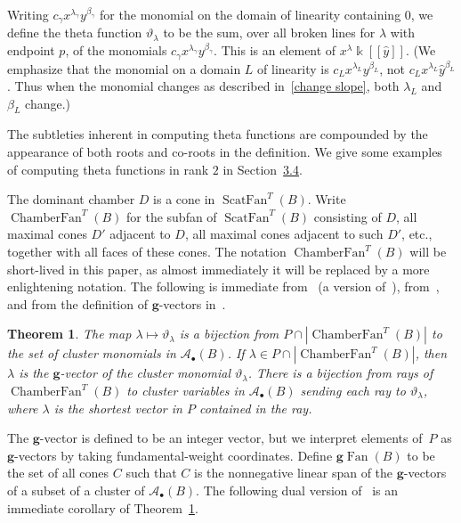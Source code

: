 \documentclass[10pt,a4paper]{amsart}
\newtheorem{theorem}{Theorem}[section]
\theoremstyle{definition}
\DeclareMathOperator{\Fan}{Fan}
\DeclareMathOperator{\ChamberFan}{ChamberFan}
\DeclareMathOperator{\ScatFan}{ScatFan}
\newcommand{\gFan}{\g\!\Fan}
\newcommand\llbracket{[\![}
\newcommand\rrbracket{]\!]}
\newcommand{\thet}{\vartheta}
\newcommand{\A}{{\mathcal A}}
\newcommand{\g}{\mathbf{g}}
\renewcommand{\k}{\Bbbk}
\newcommand{\hy}{\hat{y}}
\begin{document}
Writing $c_\gamma x^{\lambda_\gamma}y^{\beta_\gamma}$ for the monomial on the domain of linearity containing $0$, we define the theta function $\thet_\lambda$ to be the sum, over all broken lines for $\lambda$ with endpoint $p$, of the monomials $c_\gamma x^{\lambda_\gamma}y^{\beta_\gamma}$.
This is an element of $x^\lambda \k\llbracket \hy\rrbracket $.
(We emphasize that the monomial on a domain $L$ of linearity is $c_Lx^{\lambda_L}y^{\beta_L}$, not $c_Lx^{\lambda_L}\hy^{\beta_L}$.
Thus when the monomial changes as described in~\ref{change slope}, both $\lambda_L$ and $\beta_L$ change.)

The subtleties inherent in computing theta functions are compounded by the appearance of both roots and co-roots in the definition.
We give some examples of computing theta functions in rank $2$ in Section~\href{https://alco.centre-mersenne.org/articles/10.5802/alco.107/}{3.4}.

The dominant chamber $D$ is a cone in $\ScatFan^T(B)$. 
Write $\ChamberFan^T(B)$ for the subfan of $\ScatFan^T(B)$ consisting of $D$, all maximal cones $D'$ adjacent to $D$, all maximal cones adjacent to such $D'$, etc., together with all faces of these cones.
The notation $\ChamberFan^T(B)$ will be short-lived in this paper, as almost immediately it will be replaced by a more enlightening notation.
The following is immediate from~\cite[Theorem~5.2]{scatfan} (a version of~\cite[Theorem~4.9]{GHKK}), from~\cite[Corollary~5.9]{GHKK}, and from the definition of $\g$-vectors in~\cite[Section~6]{ca4}.

\begin{theorem}\label{clus mon thm}
The map $\lambda\mapsto\thet_\lambda$ is a bijection from $P\cap|\ChamberFan^T(B)|$ to the set of cluster monomials in $\A_\bullet(B)$.
If $\lambda\in P\cap|\ChamberFan^T(B)|$, then $\lambda$ is the $\g$-vector of the cluster monomial $\thet_\lambda$.
There is a bijection from rays of $\ChamberFan^T(B)$ to cluster variables in $\A_\bullet(B)$ sending each ray to $\thet_\lambda$, where $\lambda$ is the shortest vector in $P$ contained in the ray.
\end{theorem}

The $\g$-vector is defined to be an integer vector, but we interpret elements of~$P$ as $\g$-vectors by taking fundamental-weight coordinates.
Define $\gFan(B)$ to be the set of all cones $C$ such that $C$ is the nonnegative linear span of the $\g$-vectors of a subset of a cluster of $\A_\bullet(B)$.
The following dual version of~\cite[Theorem~0.8]{GHKK} is an immediate corollary of Theorem~\ref{clus mon thm}.
\end{document}
